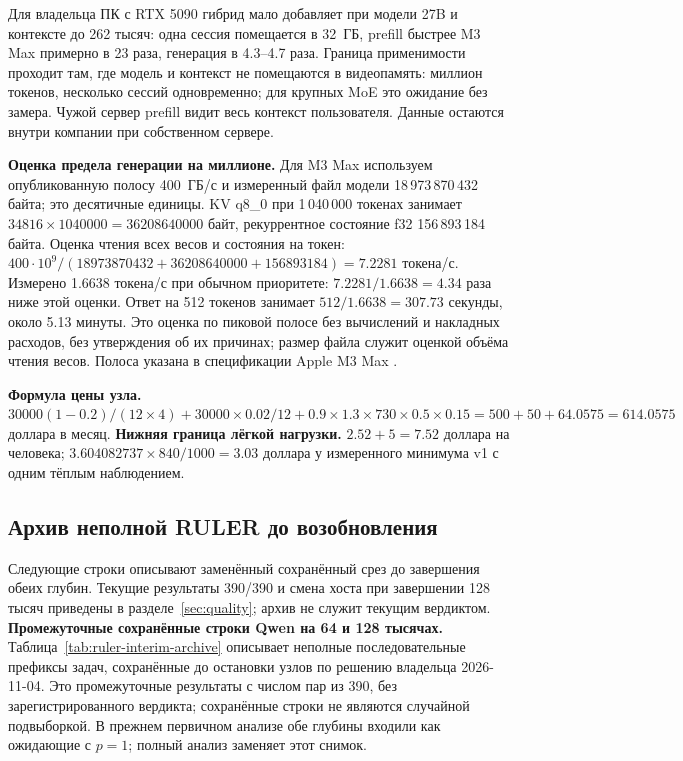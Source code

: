 Для владельца ПК с RTX 5090 гибрид мало добавляет при модели 27B и контексте до 262 тысяч:
одна сессия помещается в 32~ГБ, prefill быстрее M3 Max примерно в 23 раза, генерация в 4.3--4.7 раза.
Граница применимости проходит там, где модель и контекст не помещаются в видеопамять: миллион токенов,
несколько сессий одновременно; для крупных MoE это ожидание без замера.
Чужой сервер prefill видит весь контекст пользователя. Данные остаются внутри компании при собственном сервере.


\textbf{Оценка предела генерации на миллионе.} Для M3 Max используем опубликованную полосу
400~ГБ/с и измеренный файл модели 18\,973\,870\,432 байта; это десятичные единицы.
KV q8\_0 при 1\,040\,000 токенах занимает $34816\times1040000=36208640000$ байт,
рекуррентное состояние f32 156\,893\,184 байта. Оценка чтения всех весов и состояния на токен:
$400\cdot10^9/(18973870432+36208640000+156893184)=7.2281$ токена/с.
Измерено 1.6638 токена/с при обычном приоритете: $7.2281/1.6638=4.34$ раза ниже этой оценки.
Ответ на 512 токенов занимает $512/1.6638=307.73$ секунды, около 5.13 минуты.
Это оценка по пиковой полосе без вычислений и накладных расходов, без утверждения об их причинах;
размер файла служит оценкой объёма чтения весов. Полоса указана в спецификации Apple M3 Max \cite{appleM3}.

\textbf{Формула цены узла.} $30000(1-0.2)/(12\times4)+30000\times0.02/12+
0.9\times1.3\times730\times0.5\times0.15=500+50+64.0575=614.0575$ доллара в месяц.
\textbf{Нижняя граница лёгкой нагрузки.} $2.52+5=7.52$ доллара на человека;
$3.604082737\times840/1000=3.03$ доллара у измеренного минимума v1 с одним тёплым наблюдением.

\subsection{Архив неполной RULER до возобновления}
Следующие строки описывают заменённый сохранённый срез до завершения обеих глубин. Текущие результаты 390/390
и смена хоста при завершении 128 тысяч приведены в разделе~\ref{sec:quality}; архив не служит текущим вердиктом.
\textbf{Промежуточные сохранённые строки Qwen на 64 и 128 тысячах.}
Таблица~\ref{tab:ruler-interim-archive} описывает неполные последовательные префиксы задач,
сохранённые до остановки узлов по решению владельца 2026-11-04.
Это промежуточные результаты с числом пар из 390, без зарегистрированного вердикта;
сохранённые строки не являются случайной подвыборкой. В прежнем первичном анализе обе глубины
входили как ожидающие с $p=1$; полный анализ заменяет этот снимок.

